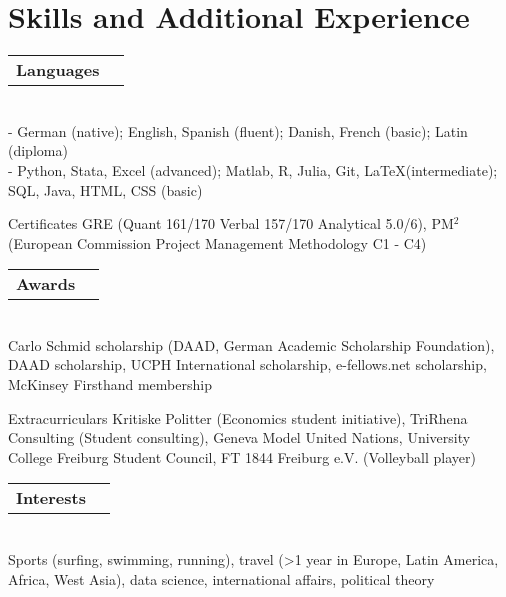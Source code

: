 \documentclass[A4,11pt]{article}
\makeatletter
\newcommand{\Subheading}[5]{   
    \begin{tabular*}{0.97\textwidth}[t]{l@{\extracolsep{\fill}}r}
      \textbf{#1}\textit{\small #2} & \small #3 
      \end{tabular*} \\
      \small #4 \\
    \vspace{7pt}
    }
\makeatother
\begin{document}





\section{Skills and Additional Experience}

    \Subheading
    {Languages}{}{}
    {- German (native); 
    English, 
    Spanish (fluent); 
    Danish, French (basic); 
    Latin (diploma)\\
    - Python, Stata, Excel (advanced); 
    Matlab, R, Julia, Git, \LaTeX\space(intermediate); 
    SQL, Java, HTML, CSS (basic)}
    
    \Subheading
    {Certificates}{}{}
    {GRE (Quant 161/170 Verbal 157/170 Analytical 5.0/6),  
    PM$^2$ (European Commission Project Management Methodology C1 - C4)}
    
    \Subheading
    {Awards}{}{}
    {Carlo Schmid scholarship (DAAD, German Academic Scholarship Foundation), 
    DAAD scholarship, 
    UCPH International scholarship, 
    e-fellows.net scholarship, 
    McKinsey Firsthand membership} 

    \Subheading
    {Extracurriculars}{}{}
    {Kritiske Politter (Economics student initiative), TriRhena Consulting (Student consulting), Geneva Model United Nations, University College Freiburg Student Council, FT 1844 Freiburg e.V. (Volleyball player)}{}

    \Subheading
    {Interests}{}{}
    {Sports (surfing, swimming, running), travel (>1 year in Europe, Latin America, Africa, West Asia), data science, international affairs, political theory}

\vfill
{}
\end{document}

